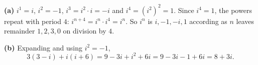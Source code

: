 \textbf{(a)} $i^1=i$, $i^2=-1$, $i^3=i^2\cdot i=-i$ and $i^4=\left(i^2\right)^2=1$. Since $i^4=1$, the powers repeat with period $4$: $i^{n+4}=i^n\cdot i^4=i^n$. So $i^n$ is $i,-1,-i,1$ according as $n$ leaves remainder $1,2,3,0$ on division by $4$.

\textbf{(b)} Expanding and using $i^2=-1$,
\[3(3-i)+i(i+6)=9-3i+i^2+6i=9-3i-1+6i=\boxed{8+3i}.\]
